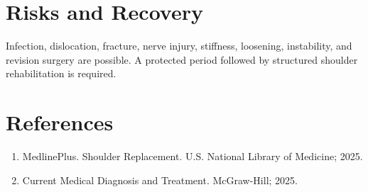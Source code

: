 \section*{Risks and Recovery}
Infection, dislocation, fracture, nerve injury, stiffness, loosening, instability, and revision surgery are possible. A protected period followed by structured shoulder rehabilitation is required.
\section*{References}
\begin{enumerate}\item MedlinePlus. Shoulder Replacement. U.S. National Library of Medicine; 2025.\item Current Medical Diagnosis and Treatment. McGraw-Hill; 2025.\end{enumerate}
\clearpage

